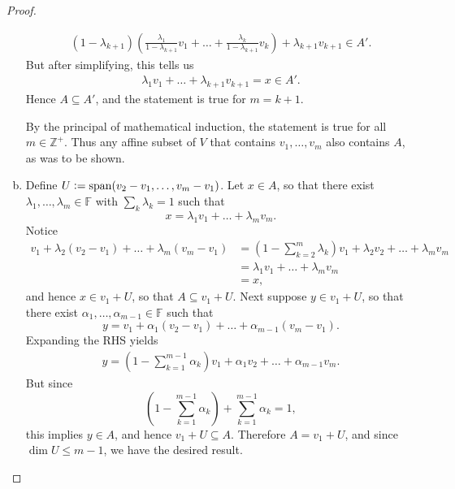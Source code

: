\documentclass{extarticle}
\newcommand{\Z}{\mathbb{Z}}
\newcommand{\F}{\mathbb{F}}
\DeclareMathOperator{\Span}{span}
\newcommand{\defeq}{\vcentcolon=}
\begin{document}
\begin{proof}
\begin{enumerate}[(a)]
\begin{align*}
(1 - \lambda_{k + 1})\left(\frac{\lambda_1}{1 - \lambda_{k + 1}}v_1 + \dots + \frac{\lambda_{k}}{1-\lambda_{k + 1}}v_k\right) + \lambda_{k + 1}v_{k + 1}\in A'.
\end{align*}
But after simplifying, this tells us
\begin{align*}
\lambda_1v_1 + \dots + \lambda_{k+1}v_{k+1} = x \in A'.
\end{align*}
Hence $A\subseteq A'$, and the statement is true for $m = k + 1$.
\par By the principal of mathematical induction, the statement is true for all $m\in\Z^+$.  Thus any affine subset of $V$ that contains $v_1,\dots, v_m$ also contains $A$, as was to be shown.
\item Define $U \defeq \Span(v_2 - v_1, \dots, v_m - v_1)$.  Let $x\in A$, so that there exist $\lambda_1,\dots, \lambda_m\in\F$ with $\sum_k\lambda_k = 1$ such that
\begin{equation*}
x = \lambda_1v_1 + \dots + \lambda_mv_m.
\end{equation*}
Notice
\begin{align*}
v_1 + \lambda_2(v_2 - v_1) + \dots + \lambda_m(v_m - v_1) &= \left(1 - \sum_{k = 2}^m\lambda_k\right)v_1 + \lambda_2v_2 + \dots + \lambda_mv_m\\
&= \lambda_1v_1 + \dots +\lambda_mv_m\\
&= x,
\end{align*}
and hence $x\in v_1 + U$, so that $A\subseteq v_1 + U$.  Next suppose $y\in v_1 + U$, so that there exist $\alpha_1,\dots,\alpha_{m - 1}\in\F$ such that
\begin{equation*}
y = v_1 + \alpha_1(v_2 - v_1) + \dots + \alpha_{m - 1}(v_m - v_1).
\end{equation*}
Expanding the RHS yields
\begin{align*}
y = \left(1 - \sum_{k = 1}^{m-1}\alpha_k\right)v_1 + \alpha_1v_2 + \dots + \alpha_{m-1}v_m.
\end{align*}
But since 
\begin{equation*}
\left(1 - \sum_{k = 1}^{m-1}\alpha_k\right)+ \sum_{k=1}^{m-1}\alpha_k = 1,
\end{equation*}
this implies $y \in A$, and hence $v_1 + U\subseteq A$.  Therefore $A = v_1 + U$, and since $\dim U \leq m - 1$, we have the desired result. \qedhere
\end{enumerate}
\end{proof}
\end{document}
